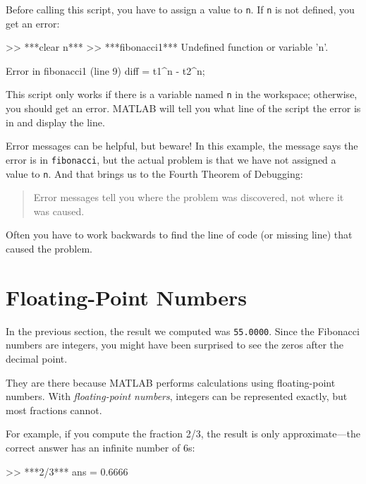 Before calling this script, you have to assign a value to \lstinline{n}.
If \lstinline{n} is not defined, you get an error:

\begin{code}
>> ***clear n***
>> ***fibonacci1***
Undefined function or variable 'n'.

Error in fibonacci1 (line 9)
diff = t1^n - t2^n;
\end{code}

This script only works if there is a variable named \lstinline{n} in the workspace; otherwise, you should get an error. 
MATLAB will tell you what line of the script the error is in and display the line.



Error messages can be helpful, but beware!
In this example, the message says the error is in \lstinline{fibonacci}, but the actual problem is that we have not assigned a value to \lstinline{n}. 
And that brings us to the Fourth Theorem of Debugging:

\begin{quote}
Error messages tell you where the problem was discovered,
not where it was caused.
\end{quote}

Often you have to work backwards to find the line of code (or missing line) that caused the problem.

\section{Floating-Point Numbers}

In the previous section, the result we computed was \lstinline{55.0000}.  Since the Fibonacci numbers are integers, you might have been surprised to see the zeros after the decimal point.

They are there because MATLAB performs calculations using floating-point numbers.  With \emph{floating-point numbers}, integers can be represented exactly, but most fractions cannot.


For example, if you compute the fraction 2/3, the result is only approximate---the correct answer has an infinite number of 6s:

\begin{code}
>> ***2/3***
ans = 0.6666
\end{code}

